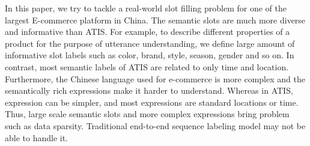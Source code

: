 

In this paper, we try to tackle a real-world slot filling problem 
for one of the largest E-commerce platform in China.
The semantic slots are much more diverse and informative than ATIS.
For example, to describe different properties of a product for 
the purpose of utterance understanding,
we define large amount of informative slot labels such as color, brand, 
style, season, gender and so on.
In contrast, most semantic labels of ATIS are related to only time and location.
Furthermore, the Chinese language used for e-commerce is more complex 
and the semantically rich expressions make it harder to understand.
Whereas in ATIS, 
expression can be simpler, and most expressions are standard locations or time.
Thus, large scale semantic slots and more complex expressions bring problem such as data sparsity.
Traditional end-to-end sequence labeling model may not be able to handle it.

